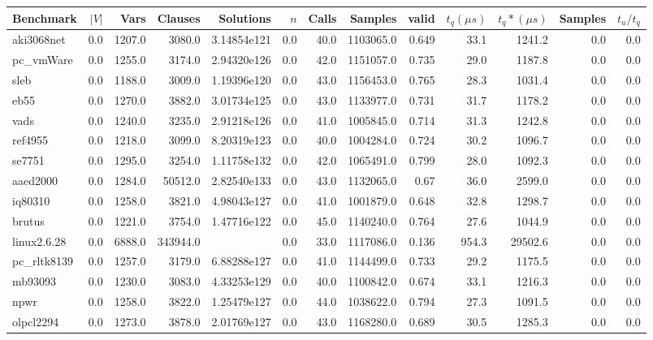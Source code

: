 \begin{tabular}{|l r r r r| r r r r r r | r r|}
\hline
Benchmark & $|V|$ & Vars & Clauses & Solutions & $n$ & Calls & Samples & valid & $t_q (\mu s)$ & $t_q* (\mu s)$ & Samples & $t_u/t_q$ \\
\hline
aki3068net & 0.0 & 1207.0 & 3080.0 & 3.14854e121 & 0.0 & 40.0 & 1103065.0 & 0.649 & 33.1 & 1241.2 & 0.0 & 0.0 \\
\hline
pc\_vmWare & 0.0 & 1255.0 & 3174.0 & 2.94320e126 & 0.0 & 42.0 & 1151057.0 & 0.735 & 29.0 & 1187.8 & 0.0 & 0.0 \\
\hline
sleb & 0.0 & 1188.0 & 3009.0 & 1.19396e120 & 0.0 & 43.0 & 1156453.0 & 0.765 & 28.3 & 1031.4 & 0.0 & 0.0 \\
\hline
eb55 & 0.0 & 1270.0 & 3882.0 & 3.01734e125 & 0.0 & 43.0 & 1133977.0 & 0.731 & 31.7 & 1178.2 & 0.0 & 0.0 \\
\hline
vads & 0.0 & 1240.0 & 3235.0 & 2.91218e126 & 0.0 & 41.0 & 1005845.0 & 0.714 & 31.3 & 1242.8 & 0.0 & 0.0 \\
\hline
ref4955 & 0.0 & 1218.0 & 3099.0 & 8.20319e123 & 0.0 & 40.0 & 1004284.0 & 0.724 & 30.2 & 1096.7 & 0.0 & 0.0 \\
\hline
se7751 & 0.0 & 1295.0 & 3254.0 & 1.11758e132 & 0.0 & 42.0 & 1065491.0 & 0.799 & 28.0 & 1092.3 & 0.0 & 0.0 \\
\hline
aaed2000 & 0.0 & 1284.0 & 50512.0 & 2.82540e133 & 0.0 & 43.0 & 1132065.0 & 0.67 & 36.0 & 2599.0 & 0.0 & 0.0 \\
\hline
iq80310 & 0.0 & 1258.0 & 3821.0 & 4.98043e127 & 0.0 & 41.0 & 1001879.0 & 0.648 & 32.8 & 1298.7 & 0.0 & 0.0 \\
\hline
brutus & 0.0 & 1221.0 & 3754.0 & 1.47716e122 & 0.0 & 45.0 & 1140240.0 & 0.764 & 27.6 & 1044.9 & 0.0 & 0.0 \\
\hline
linux2.6.28 & 0.0 & 6888.0 & 343944.0 &  & 0.0 & 33.0 & 1117086.0 & 0.136 & 954.3 & 29502.6 & 0.0 & 0.0 \\
\hline
pc\_rltk8139 & 0.0 & 1257.0 & 3179.0 & 6.88288e127 & 0.0 & 41.0 & 1144499.0 & 0.733 & 29.2 & 1175.5 & 0.0 & 0.0 \\
\hline
mb93093 & 0.0 & 1230.0 & 3083.0 & 4.33253e129 & 0.0 & 40.0 & 1100842.0 & 0.674 & 33.1 & 1216.3 & 0.0 & 0.0 \\
\hline
npwr & 0.0 & 1258.0 & 3822.0 & 1.25479e127 & 0.0 & 44.0 & 1038622.0 & 0.794 & 27.3 & 1091.5 & 0.0 & 0.0 \\
\hline
olpcl2294 & 0.0 & 1273.0 & 3878.0 & 2.01769e127 & 0.0 & 43.0 & 1168280.0 & 0.689 & 30.5 & 1285.3 & 0.0 & 0.0 \\

\end{tabular}
